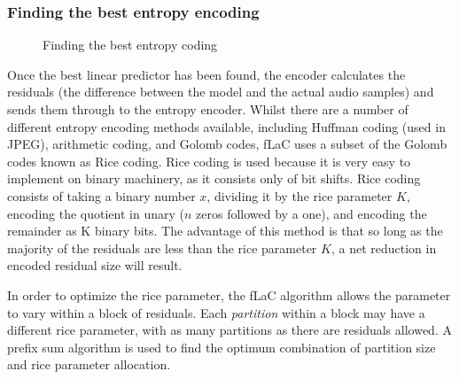 \documentclass[12pt]{scrartcl}
\begin{document}
  \subsubsection*{Finding the best entropy encoding}
  \begin{figure}[H]
    \caption{Finding the best entropy coding}
    \label{fig:entropy_optimisation}
  \end{figure}
  Once the best linear predictor has been found, the encoder calculates the residuals (the difference between the model and the actual audio samples) and sends them through to the entropy encoder. Whilst there are a number of different entropy encoding methods available, including Huffman coding (used in JPEG\cite{huffman_jpeg}), arithmetic coding, and Golomb codes, fLaC uses a subset of the Golomb codes known as Rice coding. Rice coding is used because it is very easy to implement on binary machinery, as it consists only of bit shifts. Rice coding consists of taking a binary number \(x\), dividing it by the rice parameter \(K\), encoding the quotient in unary (\(n\) zeros followed by a one), and encoding the remainder as K binary bits. The advantage of this method is that so long as the majority of the residuals are less than the rice parameter \(K\), a net reduction in encoded residual size will result. 
  
  In order to optimize the rice parameter, the fLaC algorithm allows the parameter to vary within a block of residuals. Each \textit{partition} within a block may have a different rice parameter, with as many partitions as there are residuals allowed.  A prefix sum algorithm is used to find the optimum combination of partition size and rice parameter allocation. 
  
\end{document}
